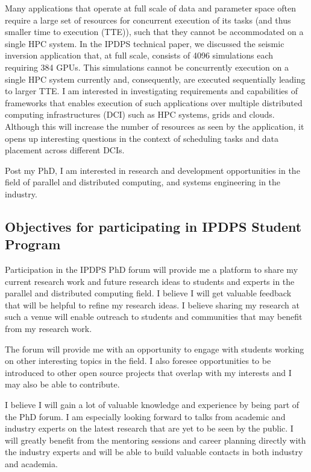 Many applications that operate at full scale of data and parameter space often
require a large set of resources for concurrent execution of its tasks (and thus
smaller time to execution (TTE)), such that they cannot be accommodated on a 
single HPC system. In the IPDPS technical paper, we discussed the seismic 
inversion application that, at full scale, consists of 4096 simulations each 
requiring 384 GPUs. This simulations cannot be concurrently execution on a 
single HPC system currently and, consequently, are executed sequentially leading
to larger TTE. I am interested in investigating requirements and capabilities of 
frameworks that enables execution of such applications over multiple distributed 
computing infrastructures (DCI) such as HPC systems, grids and clouds. Although
this will increase the number of resources as seen by the application, it opens 
up interesting questions in the context of scheduling tasks and data placement 
across different DCIs.

Post my PhD, I am interested in research and development opportunities in 
the field of parallel and distributed computing, and systems engineering in the 
industry.


\subsection{Objectives for participating in IPDPS Student Program}

Participation in the IPDPS PhD forum will provide me a platform to share my 
current research work and future research ideas to students and experts in
the parallel and distributed computing field. I believe I will get valuable 
feedback that will be helpful to refine my research ideas. I believe sharing my 
research at such a venue will enable outreach to students and communities that 
may benefit from my research work.

The forum will provide me with an opportunity to engage with students working
on other interesting topics in the field. I also foresee opportunities to be 
introduced to other open source projects that overlap with my interests and
I may also be able to contribute.

I believe I will gain a lot of valuable knowledge and experience by being part
of the PhD forum. I am especially looking forward to talks from academic and 
industry experts on the latest research that are yet to be seen by the public. 
I will greatly benefit from the mentoring sessions and career planning directly 
with the industry experts and will be able to build valuable contacts in both 
industry and academia.

